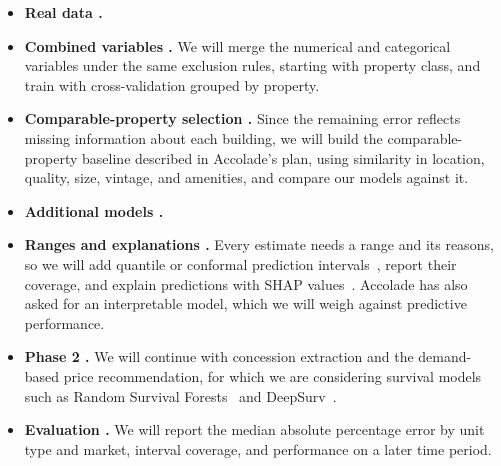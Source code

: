 \begin{itemize}
  \item \textbf{Real data .} 
  \item \textbf{Combined variables .} We will merge the numerical and categorical
  variables under the same exclusion rules, starting with property class,  and train with cross-validation grouped
  by property.
  \item \textbf{Comparable-property selection .} Since the remaining
  error reflects missing information about each building, we will build the comparable-property
  baseline described in Accolade's plan, using similarity in location, quality, size, vintage, and
  amenities, and compare our models against it.
  \item \textbf{Additional models .} 
  \item \textbf{Ranges and explanations .} Every estimate needs a range and
  its reasons, so we will add quantile or conformal prediction
  intervals~\autocite{angelopoulos2023gentle}, report their coverage, and explain predictions with
  SHAP values~\autocite{lundberg2017unified}. Accolade has also asked for an interpretable model,
  which we will weigh against predictive performance.
  \item \textbf{Phase 2 .} We will continue with concession extraction and the
  demand-based price recommendation, for which we are considering survival models such as Random
  Survival Forests~\autocite{ishwaran2008random} and DeepSurv~\autocite{katzman2018deepsurv}.
  \item \textbf{Evaluation .} We will report the median absolute percentage error by
  unit type and market, interval coverage, and performance on a later time period.
\end{itemize}
